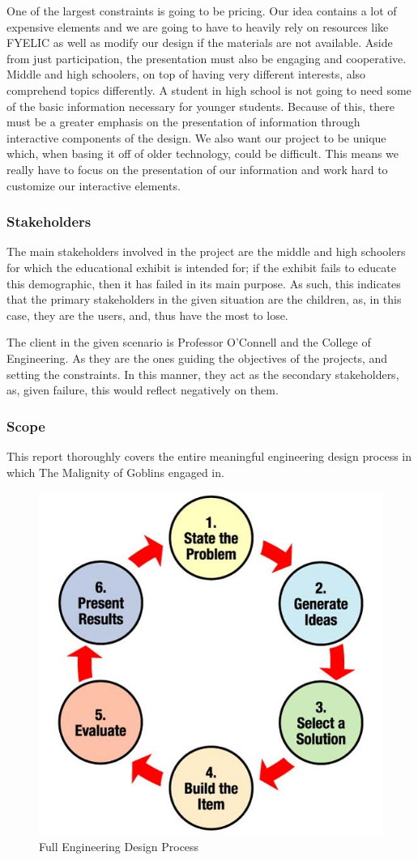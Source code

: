 \documentclass[conference]{IEEEtran}
\begin{document}
\par One of the largest constraints is going to be pricing. Our idea contains a lot of expensive elements and we are going to have to heavily rely on resources like FYELIC as well as modify our design if the materials are not available. Aside from just participation, the presentation must also be engaging and cooperative. Middle and high schoolers, on top of having very different interests, also comprehend topics differently. A student in high school is not going to need some of the basic information necessary for younger students. Because of this, there must be a greater emphasis on the presentation of information through interactive components of the design. We also want our project to be unique which, when basing it off of older technology, could be difficult. This means we really have to focus on the presentation of our information and work hard to customize our interactive elements.

\subsubsection{Stakeholders}

\par The main stakeholders involved in the project are the middle and high schoolers for which the educational exhibit is intended for; if the exhibit fails to educate this demographic, then it has failed in its main purpose. As such, this indicates that the primary stakeholders in the given situation are the children, as, in this case, they are the users, and, thus have the most to lose.
\par The client in the given scenario is Professor O'Connell and the College of Engineering. As they are the ones guiding the objectives of the projects, and setting the constraints. In this manner, they act as the secondary stakeholders, as, given failure, this would reflect negatively on them.

\subsubsection{Scope}

\par This report thoroughly covers the entire meaningful engineering design process in which The Malignity of Goblins engaged in.

\begin{figure}[H]
  \centering
  \includegraphics[width=.45\textwidth]{Figures/EDP.jpg}
  \caption{Full Engineering Design Process}
  \label{fig:1}
\end{figure}
\end{document}
